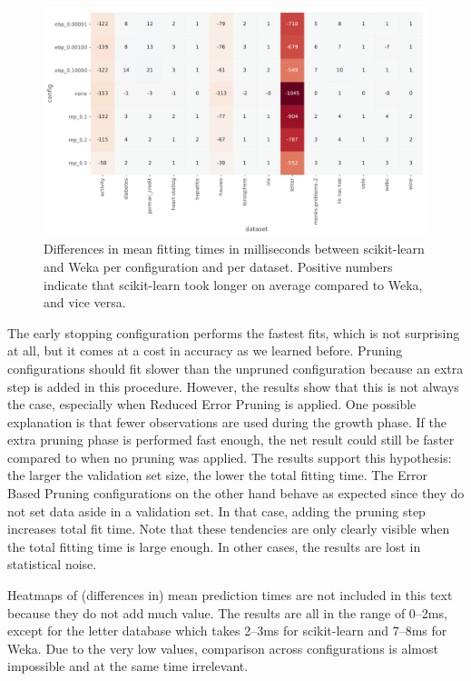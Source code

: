 \begin{figure}[htp]
    \includegraphics[width=\textwidth]{img/heatmap_fit_time_diff.pdf}
    \caption{Differences in mean fitting times in milliseconds between scikit-learn and Weka per configuration and per dataset. Positive numbers indicate that scikit-learn took longer on average compared to Weka, and vice versa.}%
    \label{fig:heat_fit_diff}
\end{figure}

The early stopping configuration performs the fastest fits, which is not surprising at all, but it comes at a cost in accuracy as we learned before. Pruning configurations should fit slower than the unpruned configuration because an extra step is added in this procedure. However, the results show that this is not always the case, especially when Reduced Error Pruning is applied. One possible explanation is that fewer observations are used during the growth phase. If the extra pruning phase is performed fast enough, the net result could still be faster compared to when no pruning was applied. The results support this hypothesis: the larger the validation set size, the lower the total fitting time. The Error Based Pruning configurations on the other hand behave as expected since they do not set data aside in a validation set. In that case, adding the pruning step increases total fit time. Note that these tendencies are only clearly visible when the total fitting time is large enough. In other cases, the results are lost in statistical noise.

Heatmaps of (differences in) mean prediction times are not included in this text because they do not add much value. The results are all in the range of 0--2ms, except for the letter database which takes 2--3ms for scikit-learn and 7--8ms for Weka. Due to the very low values, comparison across configurations is almost impossible and at the same time irrelevant.

